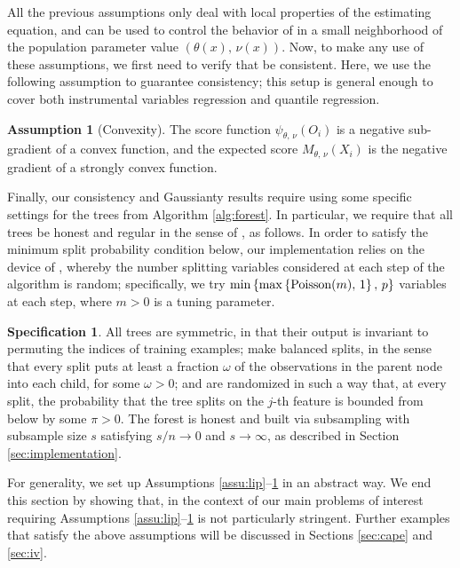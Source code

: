 \documentclass[aos]{imsart}
\theoremstyle{plain}
\theoremstyle{definition}
\newtheorem{assu}{Assumption}
\newtheorem{spec}{Specification}
\theoremstyle{remark}
\begin{document}
\begin{CJK}{UTF8}{gbsn}
All the previous assumptions only deal with local properties of the estimating
equation, and can be used to control the behavior of 
in a small neighborhood of the population parameter value $(\theta(x), \, \nu(x))$.
Now, to make any use of these assumptions, we first need to verify that 
 be consistent. Here, we use the following assumption
to guarantee consistency; this setup is general enough to cover both instrumental
variables regression and quantile regression.

\begin{assu}[Convexity]
\label{assu:convexity}
The score function $\psi_{\theta, \, \nu}(O_i)$ is a negative sub-gradient of a convex function,
and the expected score $M_{\theta, \, \nu}(X_i)$ is the negative gradient of a strongly convex function.
\end{assu}

Finally, our consistency and Gaussianty results require using some specific settings
for the trees from Algorithm \ref{alg:forest}.
In particular, we require that all trees be honest and regular in the sense of \citet{wager2015estimation}, as follows.
In order to satisfy the minimum split probability condition below,
our implementation relies on the device of \citet{denil2014narrowing}, whereby the number splitting variables
considered at each step of the algorithm is random; specifically, we try
$\min\left\{\max\left\{\text{Poisson$(m)$}, \, 1\right\}, \, p\right\}$ variables at each step,
where $m > 0$ is a tuning parameter.

\begin{spec}
\label{spec:forest}
All trees are symmetric, in that their output is invariant to permuting
the indices of training examples;
make balanced splits, in the sense that every split puts at least a fraction
$\omega$ of the observations in the parent node into each child, for some $\omega > 0$; and
are randomized in such a way that, at every split, the probability that
the tree splits on the $j$-th feature is bounded from below by some $\pi > 0$.
The forest is honest and built via subsampling
with subsample size $s$ satisfying $s/n \rightarrow 0$ and $s \rightarrow \infty$,
as described in Section \ref{sec:implementation}.
\end{spec}

For generality, we set up Assumptions \ref{assu:lip}--\ref{assu:convexity}
in an abstract way. We end this section by showing that, in the context of our
main problems of interest requiring Assumptions \ref{assu:lip}--\ref{assu:convexity} is
not particularly stringent. Further examples that satisfy the above assumptions will
be discussed in Sections \ref{sec:cape} and \ref{sec:iv}.


\end{CJK}
\end{document}
